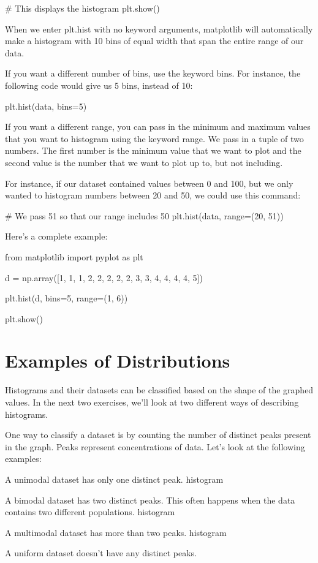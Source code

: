 \documentclass{journal}
\begin{document}
# This displays the histogram
plt.show()

When we enter plt.hist with no keyword arguments, matplotlib will automatically make a histogram with 10 bins of equal width that span the entire range of our data.

If you want a different number of bins, use the keyword bins. For instance, the following code would give us 5 bins, instead of 10:

plt.hist(data, bins=5)

If you want a different range, you can pass in the minimum and maximum values that you want to histogram using the keyword range. We pass in a tuple of two numbers. The first number is the minimum value that we want to plot and the second value is the number that we want to plot up to, but not including.

For instance, if our dataset contained values between 0 and 100, but we only wanted to histogram numbers between 20 and 50, we could use this command:

# We pass 51 so that our range includes 50
plt.hist(data, range=(20, 51))

Here’s a complete example:

from matplotlib import pyplot as plt

d = np.array([1, 1, 1, 2, 2, 2, 2, 2, 3, 3, 4, 4, 4, 4, 5])

plt.hist(d, bins=5, range=(1, 6))

plt.show()


\section{Examples of Distributions}
Histograms and their datasets can be classified based on the shape of the graphed values. In the next two exercises, we'll look at two different ways of describing histograms.

One way to classify a dataset is by counting the number of distinct peaks present in the graph. Peaks represent concentrations of data. Let's look at the following examples:

A unimodal dataset has only one distinct peak. histogram

A bimodal dataset has two distinct peaks. This often happens when the data contains two different populations. histogram

A multimodal dataset has more than two peaks. histogram

A uniform dataset doesn't have any distinct peaks. 
\end{document}
